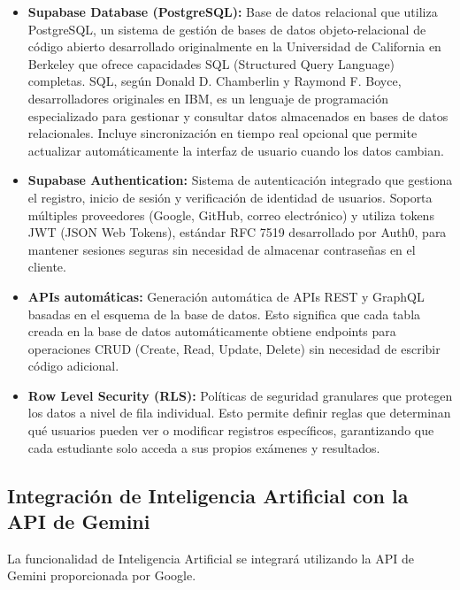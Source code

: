\documentclass[12pt,a4paper]{report}
\begin{document}
\begin{itemize}
\item \textbf{Supabase Database (PostgreSQL):} Base de datos relacional que utiliza PostgreSQL, un sistema de gestión de bases de datos objeto-relacional de código abierto desarrollado originalmente en la Universidad de California en Berkeley que ofrece capacidades SQL (Structured Query Language) completas. SQL, según Donald D. Chamberlin y Raymond F. Boyce, desarrolladores originales en IBM, es un lenguaje de programación especializado para gestionar y consultar datos almacenados en bases de datos relacionales. Incluye sincronización en tiempo real opcional que permite actualizar automáticamente la interfaz de usuario cuando los datos cambian.

\item \textbf{Supabase Authentication:} Sistema de autenticación integrado que gestiona el registro, inicio de sesión y verificación de identidad de usuarios. Soporta múltiples proveedores (Google, GitHub, correo electrónico) y utiliza tokens JWT (JSON Web Tokens), estándar RFC 7519 desarrollado por Auth0, para mantener sesiones seguras sin necesidad de almacenar contraseñas en el cliente.

\item \textbf{APIs automáticas:} Generación automática de APIs REST y GraphQL basadas en el esquema de la base de datos. Esto significa que cada tabla creada en la base de datos automáticamente obtiene endpoints para operaciones CRUD (Create, Read, Update, Delete) sin necesidad de escribir código adicional.

\item \textbf{Row Level Security (RLS):} Políticas de seguridad granulares que protegen los datos a nivel de fila individual. Esto permite definir reglas que determinan qué usuarios pueden ver o modificar registros específicos, garantizando que cada estudiante solo acceda a sus propios exámenes y resultados.
\end{itemize}

\subsection{Integración de Inteligencia Artificial con la API de Gemini}

La funcionalidad de Inteligencia Artificial se integrará utilizando la API de Gemini proporcionada por Google.
\end{document}

